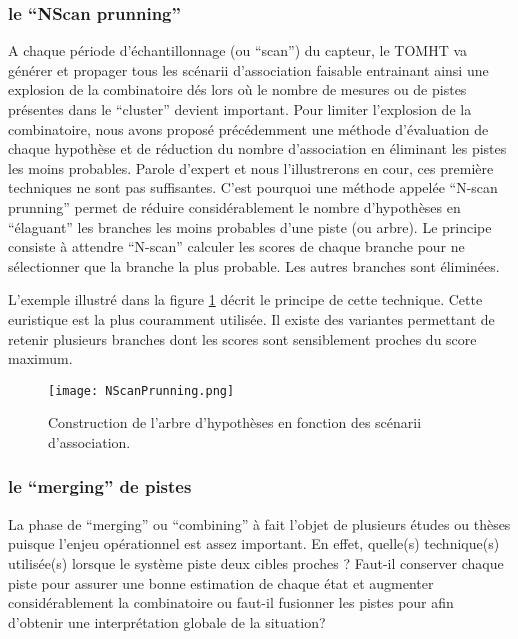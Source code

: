 \documentclass[10pt,french,a4paper]{report}
\begin{document}
			 \subsubsection{le ``NScan prunning''}
			 
			 A chaque période d'échantillonnage (ou ``scan'') du capteur, le \acf{TOMHT} va générer et propager tous les scénarii d'association faisable entrainant ainsi une explosion de la combinatoire dés lors où le nombre de mesures ou de pistes présentes dans le ``cluster'' devient important. Pour limiter l'explosion de la combinatoire, nous avons proposé précédemment une méthode d'évaluation de chaque hypothèse et de réduction du nombre d'association  en éliminant les pistes les moins probables. Parole d'expert et nous l'illustrerons en cour, ces première techniques ne sont pas suffisantes. C'est pourquoi une méthode appelée ``N-scan prunning'' permet de réduire considérablement le nombre d'hypothèses en ``élaguant'' les branches les moins probables d'une piste (ou arbre). Le principe consiste à attendre ``N-scan''  calculer les scores de chaque branche pour ne sélectionner que la branche la plus probable. Les autres branches sont éliminées. 
			 
			 L'exemple illustré dans la figure \ref{fig:arbre} décrit le principe de cette technique. Cette euristique est la plus couramment utilisée. Il existe des variantes permettant de retenir plusieurs branches dont les scores sont sensiblement proches du score maximum. 
\begin{center}
\begin{figure}
\texttt{[image: NScanPrunning.png]} 
\caption{Construction de l'arbre d'hypothèses en fonction des scénarii d'association.}
\label{fig:arbre}
\end{figure}		 
\end{center}
\subsubsection{le ``merging'' de pistes}
	La phase de ``merging'' ou ``combining'' à fait l'objet de plusieurs études ou thèses puisque l'enjeu opérationnel est assez important. En effet, quelle(s) technique(s) utilisée(s) lorsque le système piste deux cibles proches ? Faut-il conserver chaque piste pour assurer une bonne estimation de chaque état et augmenter considérablement la combinatoire ou faut-il fusionner les pistes pour afin d'obtenir une interprétation globale de la situation? 
\end{document}
